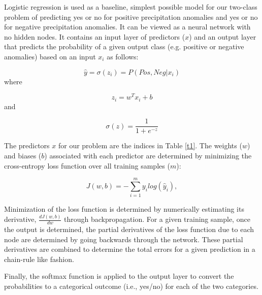 \documentclass{ametsocV6.1}
\begin{document}

\appendix[A] 
\label{appendix:A}
Logistic regression is used as a baseline, simplest possible model for our two-class problem of predicting yes or no for positive precipitation anomalies and yes or no for negative precipitation anomalies. It can be viewed as a neural network with no hidden nodes. It contains an input layer of predictors ($x$) and an output layer that predicts the probability of a given output class (e.g. positive or negative anomalies) based on an input $x_i$ as follows:

\begin{equation}
\label{eq:1}
\hat{y}=\sigma(z_i) = P( Pos, Neg | x_i)
\end{equation} where 

\begin{equation}
\label{eq:2}
z_i=w^Tx_{i}+b
\end{equation} and 

\begin{equation}
\label{eq:3}
\sigma(z)=\frac{1}{1+e^{-z}}
\end{equation}

The predictors ${x}$ for our problem are the indices in Table \ref{t1}. The weights ($w$) and biases ($b$) associated with each predictor are determined by minimizing the cross-entropy loss function over all training samples ($m$): 

\begin{equation}
\label{eq:4}
J(w,b)=-\sum_{i=1}^{m}{y_{i}log(\hat{y}_{i})},
\end{equation}

Minimization of the loss function is determined by numerically estimating its derivative, $\frac{dJ(w,b)}{dw}$ through backpropagation.  For a given training sample, once the output is determined, the partial derivatives of the loss function due to each node are determined by going backwards through the network.  These partial derivatives are combined to determine the total errors for a given prediction in a chain-rule like fashion.   

Finally, the softmax function is applied to the output layer to convert the probabilities to a categorical outcome (i.e., yes/no) for each of the two categories. 
\end{document}
